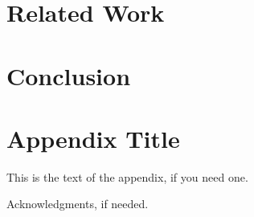 \documentclass{sigplanconf}
\begin{document}
\section{Related Work}

\section{Conclusion}


\appendix
\section{Appendix Title}

This is the text of the appendix, if you need one.

\acks

Acknowledgments, if needed.


\makeatletter
  \def\@seccntformat#1{Appendix~\csname the#1\endcsname:\quad}
\makeatother




\end{document}
